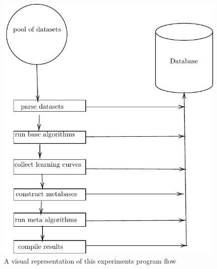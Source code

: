 \begin{figure}
  \includegraphics{Chapters/Images/MetaLearnerFLowchart/MetaLearnerFlowchart.pdf}
  \caption{A visual representation of this experiments program flow}
\end{figure}

